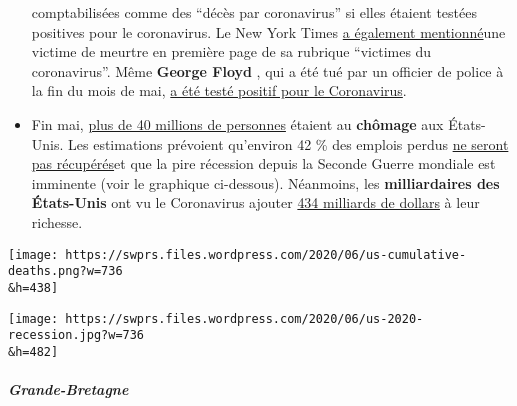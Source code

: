 \begin{itemize}
  comptabilisées comme des ``décès par coronavirus'' si elles étaient
  testées positives pour le coronavirus. Le New York Times
  \href{https://www.washingtontimes.com/news/2020/may/24/new-york-times-lists-homicide-victim-coronavirus-d/}{a
  également mentionné}une victime de meurtre en première page de sa
  rubrique ``victimes du coronavirus''. Même \textbf{George Floyd} , qui
  a été tué par un officier de police à la fin du mois de mai,
  \href{https://www.nydailynews.com/coronavirus/ny-coronavirus-george-floyd-20200604-pvhrtjn4mna5blzow3gfx5ag3y-story.html}{a
  été testé positif pour le Coronavirus}.
\item
  Fin mai,
  \href{https://www.businessinsider.com/us-weekly-jobless-claims-unemployment-filings-coronavirus-labor-market-layoffs-2020-5}{plus
  de 40 millions de personnes} étaient au \textbf{chômage} aux
  États-Unis. Les estimations prévoient qu'environ 42 \% des emplois
  perdus
  \href{https://www.forbes.com/sites/kenrapoza/2020/05/15/some-42-of-jobs-lost-in-pandemic-are-gone-for-good/}{ne
  seront pas récupérés}et que la pire récession depuis la Seconde Guerre
  mondiale est imminente (voir le graphique ci-dessous). Néanmoins, les
  \textbf{milliardaires des États-Unis} ont vu le Coronavirus ajouter
  \href{https://www.cnbc.com/2020/05/21/american-billionaires-got-434-billion-richer-during-the-pandemic.html}{434
  milliards de dollars} à leur richesse.
\end{itemize}

\texttt{[image: https://swprs.files.wordpress.com/2020/06/us-cumulative-deaths.png?w=736\\\&h=438]}

\texttt{[image: https://swprs.files.wordpress.com/2020/06/us-2020-recession.jpg?w=736\\\&h=482]}

\hypertarget{grande-bretagne}{%
\subparagraph{\texorpdfstring{\textbf{Grande-Bretagne}}{Grande-Bretagne}}\label{grande-bretagne}}

